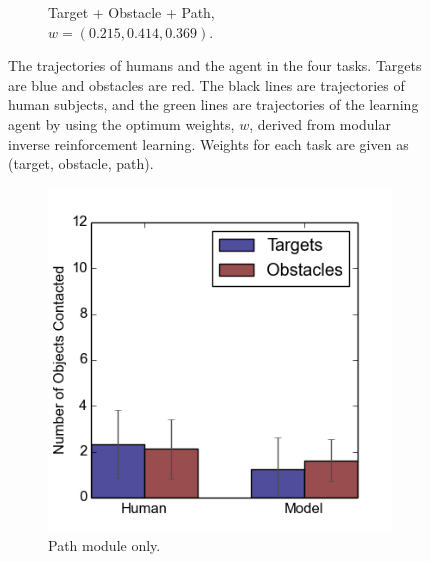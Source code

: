 \begin{figure}[h]
\begin{subfigure}[b]{0.24\textwidth}
\caption{Target + Obstacle + Path, \\$w = (0.215, 0.414, 0.369)$. }
\end{subfigure}
\caption{The trajectories of humans and the agent in the four tasks. Targets are blue and obstacles are red. The
black lines are trajectories of human subjects, and the green lines are
trajectories of the learning agent by using the optimum weights, $w$, derived
from modular inverse reinforcement learning. Weights for each task are given as (target,
obstacle, path).}

\label{fig:exp}
\end{figure}

\begin{figure}[h]
\centering
\begin{subfigure}[b]{0.24\textwidth}
\includegraphics[width=\textwidth]{contact1.png}
\caption{Path module only. }
\end{subfigure}
\begin{subfigure}[b]{0.24\textwidth}

\end{subfigure}
\end{figure}
